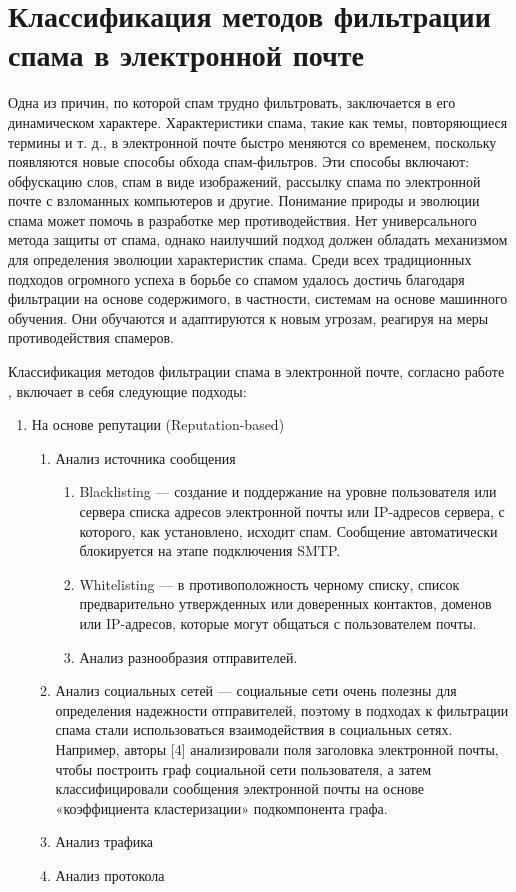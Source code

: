 \chapter*{Классификация методов фильтрации спама в электронной почте}\label{Chapter:Filtering}

Одна из причин, по которой спам трудно фильтровать, заключается в
его динамическом характере. Характеристики спама, такие как темы,
повторяющиеся термины и т. д., в электронной почте быстро меняются
со временем, поскольку появляются новые способы обхода спам-фильтров.
Эти способы включают: обфускацию слов, спам в виде изображений,
рассылку спама по электронной почте с взломанных компьютеров и другие.
Понимание природы и эволюции спама может помочь в разработке мер
противодействия. Нет универсального метода защиты от спама, однако
наилучший подход должен обладать механизмом для определения эволюции
характеристик спама. Среди всех традиционных подходов огромного успеха
в борьбе со спамом удалось достичь благодаря фильтрации на основе
содержимого, в частности, системам на основе машинного обучения.
Они обучаются и адаптируются к новым угрозам, реагируя на меры
противодействия спамеров.

Классификация методов фильтрации спама в электронной почте,
согласно работе \cite{filters}, включает в себя следующие подходы:
\begin{enumerate}
    \item На основе репутации (Reputation-based)
        \begin{enumerate}
            \item Анализ источника сообщения
            \begin{enumerate}
                \item Blacklisting — создание и поддержание на уровне пользователя 
                или сервера списка адресов электронной почты или IP-адресов сервера, 
                с которого, как установлено, исходит спам. Сообщение автоматически 
                блокируется на этапе подключения SMTP.
                \item Whitelisting — в противоположность черному списку, список 
                предварительно утвержденных или доверенных контактов, доменов или 
                IP-адресов, которые могут общаться с пользователем почты.
                \item Анализ разнообразия отправителей.
            \end{enumerate}
        \item Анализ социальных сетей — социальные сети очень полезны для определения 
        надежности отправителей, поэтому в подходах к фильтрации спама стали использоваться 
        взаимодействия в социальных сетях. Например, авторы [4] анализировали поля заголовка 
        электронной почты, чтобы построить граф социальной сети пользователя, а затем классифицировали 
        сообщения электронной почты на основе «коэффициента кластеризации» подкомпонента графа.
        \item Анализ трафика
        \item Анализ протокола
    \end{enumerate}
\end{enumerate}
   